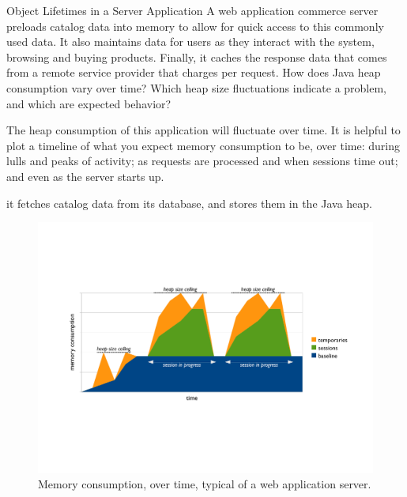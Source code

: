 \begin{example}{Object Lifetimes in a Server Application}
A web application commerce server preloads catalog data into memory to allow for
quick access to this commonly used data. It also maintains data for users as they
interact with the system, browsing and buying products. Finally, it 
caches the response data that comes from a remote service provider that charges
per request. How does Java heap consumption vary over time? Which heap size
fluctuations indicate a problem, and which are expected behavior?
\end{example}

The heap consumption of this application will fluctuate over time. It is
helpful to plot a timeline of what you expect memory consumption to be, over
time: during lulls and peaks of activity; as requests are processed and when
sessions time out; and even as the server starts up.


it fetches catalog data from its database, and stores them in the Java heap. 

\begin{figure}
	\centering
	\includegraphics[width=\textwidth]{Figures/lifetime/timeline-base-session-temps}
	\caption{Memory consumption, over time, typical of a web application server.}
	\label{fig:timeline-base-session-temps}
\end{figure}

